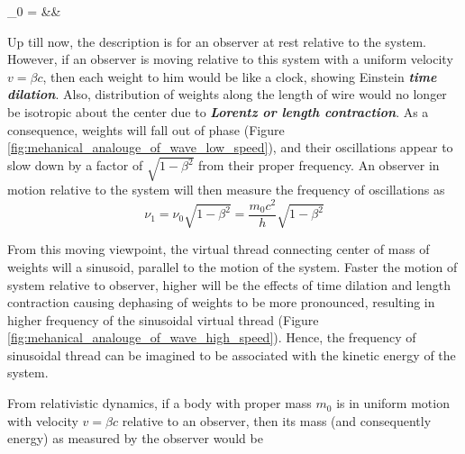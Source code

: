 \documentclass[11pt, a4paper]{article}
\begin{document}
	\begin{flalign}\label{eq:proper_freq_to_rest_energy}
		 \quad \nu_{0} = &&
	\end{flalign}
	
	Up till now, the description is for an observer at rest relative to the system. However, if an observer is moving relative to this system with a uniform velocity $v = \beta c$, then each weight to him would be like a clock, showing Einstein \textbf{\textit{time dilation}}. Also, distribution of weights along the length of wire would no longer be isotropic about the center due to \textbf{\textit{Lorentz or length contraction}}. As a consequence, weights will fall out of phase (Figure \ref{fig:mehanical_analouge_of_wave_low_speed}), and their oscillations appear to slow down by a factor of $\sqrt{1 - \beta^{2}}$ from their proper frequency. An observer in motion relative to the system will then measure the frequency of oscillations as
	\begin{equation}\label{eq:relaativistic_oscillation_freq}
		\nu_{1} = \nu_{0}\sqrt{1 - \beta^{2}} = \frac{m_{0}c^{2}}{h}\sqrt{1 - \beta^{2}}
	\end{equation}
	
	From this moving viewpoint, the virtual thread connecting center of mass of weights will a sinusoid, parallel to the motion of the system. Faster the motion of system relative to observer, higher will be the effects of time dilation and length contraction causing dephasing of weights to be more pronounced, resulting in higher frequency of the sinusoidal virtual thread (Figure \ref{fig:mehanical_analouge_of_wave_high_speed}). Hence, the frequency of sinusoidal thread can be imagined to be associated with the kinetic energy of the system.
	
	From relativistic dynamics, if a body with proper mass $m_{0}$ is in uniform motion with velocity $v = \beta c$ relative to an observer, then its mass (and consequently energy) as measured by the observer would be
	
\end{document}
